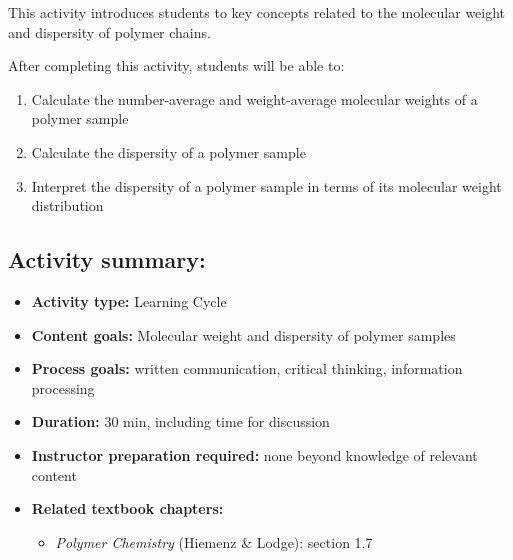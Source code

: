 %
%
%
%

\renewcommand{\figpath}{content/intro/M-and-D/figs}
\renewcommand{\labelbase}{M-and-D}

\begin{activity}

\begin{instructornotes}

	This activity introduces students to key concepts related to the molecular weight and dispersity of polymer chains.
	
	After completing this activity, students will be able to:
			\begin{enumerate}
				\item Calculate the number-average and weight-average molecular weights of a polymer sample
				\item Calculate the dispersity of a polymer sample
				\item Interpret the dispersity of a polymer sample in terms of its molecular weight distribution
			\end{enumerate}
			
	\subsection*{Activity summary:}
	\begin{itemize}
		\item \textbf{Activity type:} Learning Cycle
		\item \textbf{Content goals:} Molecular weight and dispersity of polymer samples
		\item \textbf{Process goals:} %
			written communication, critical thinking, information processing
		\item \textbf{Duration:} 30 min, including time for discussion
		\item \textbf{Instructor preparation required:} none beyond knowledge of relevant content
		\item \textbf{Related textbook chapters:}
			\begin{itemize}
				\item \emph{Polymer Chemistry} (Hiemenz \& Lodge): section 1.7
			\end{itemize}
	\end{itemize}


\end{instructornotes}
\end{activity}
